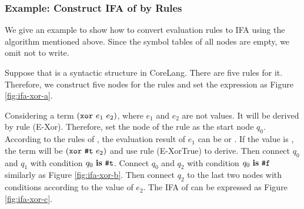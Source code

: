 \subsubsection{Example: Construct IFA of  by Rules}

We give an example to show how to convert evaluation rules to IFA using the algorithm mentioned above. Since the symbol tables of all nodes are empty, we omit not to write.


Suppose that  is a syntactic structure in CoreLang. There are five rules for it. Therefore, we construct five nodes for the rules and set the expression as Figure \ref{fig:ifa-xor-a}.

Considering a term $(\mbox{\tt xor}~e_1~e_2)$, where $e_1$ and $e_2$ are not values. It will be derived by rule (E-Xor). Therefore, set the node of the rule as the start node $q_0$. According to the rules of , the evaluation result of $e_1$ can be  or . If the value is , the term will be $(\mbox{\tt xor}~\mbox{\tt \#t}~e_2)$ and use rule (E-XorTrue) to derive. Then connect $q_0$ and $q_1$ with condition $q_0~\mbox{\rm \bf is}~\mbox{\tt \#t}$. Connect $q_0$ and $q_2$ with condition $q_0~\mbox{\rm \bf is}~\mbox{\tt \#f}$ similarly as Figure \ref{fig:ifa-xor-b}. Then connect $q_2$ to the last two nodes with conditions according to the value of $e_2$. The IFA of  can be expressed as Figure \ref{fig:ifa-xor-c}.

